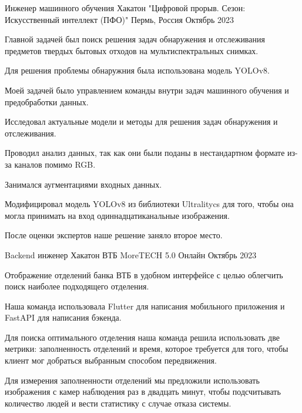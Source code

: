 \begin{cventries}
\cventry
{Инженер машинного обучения} %
{Хакатон "Цифровой прорыв. Сезон: Искусственный интеллект (ПФО)"} %
{Пермь, Россия} %
{Октябрь 2023} %
{
  \begin{cvitems} %
    \item {Главной задачей был поиск решения задач обнаружения и отслеживания предметов твердых бытовых отходов на мультиспектральных снимках. }
    \item {Для решения проблемы обнаружния была использована модель YOLOv8. } 
    \item {Моей задачей было управлением команды внутри задач машинного обучения и предобработки данных. }
    \item {Исследовал актуальные модели и методы для решения задач обнаружения и отслеживания. }
    \item {Проводил анализ данных, так как они были поданы в нестандартном формате из-за каналов помимо RGB. }
    \item {Занимался аугментациями входных данных. }
    \item {Модифицировал модель YOLOv8 из библиотеки Ultralitycs для того, чтобы она могла принимать на вход одиннадцатиканальные изображения. }
    \item {После оценки экспертов наше решение заняло второе место. }
  \end{cvitems}
}
\cventry
{Backend инженер} %
{Хакатон ВТБ MoreTECH 5.0} %
{Онлайн} %
{Октябрь 2023} %
{
  \begin{cvitems} %
    \item {Отображение отделений банка ВТБ в удобном интерфейсе с целью облегчить поиск наиболее подходящего отделения. }
    \item {Наша команда использовала Flutter для написания мобильного приложения и FastAPI для написания бэкенда. } 
    \item {Для поиска оптимального отделения наша команда решила использовать две метрики: заполненность отделений и время, которое требуется для того, чтобы клиент мог добраться выбранным способом передвижения. }
    \item {Для измерения заполненности отделений мы предложили использовать изображения с камер наблюдения раз в двадцать минут, чтобы подсчитывать количество людей и вести статистику с случае отказа системы. }

\end{cvitems}}
\end{cventries}
